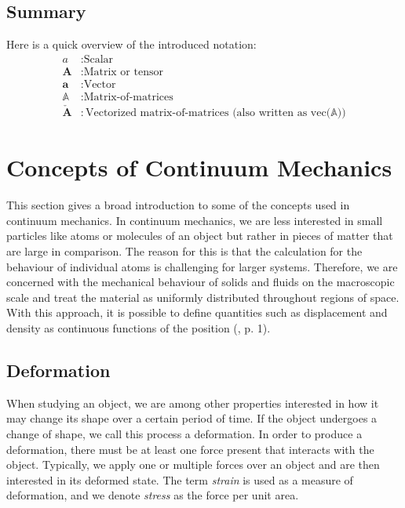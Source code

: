 \subsection{Summary}
Here is a quick overview of the introduced notation:
\begin{align*}
a&: \text{Scalar} \\
\mathbf{A}&: \text{Matrix or tensor} \\
\mathbf{a}&: \text{Vector} \\
\mathbb{A}&: \text{Matrix-of-matrices} \\
\mathbf{\check{A}}&: \text{Vectorized matrix-of-matrices (also written as vec($\mathbb{A}$))}
\end{align*}

\section{Concepts of Continuum Mechanics}
This section gives a broad introduction to some of the concepts used in continuum mechanics. In continuum mechanics, we are less interested in small particles like atoms or molecules of an object but rather in pieces of matter that are large in comparison. The reason for this is that the calculation for the behaviour of individual atoms is challenging for larger systems. Therefore, we are concerned with the mechanical behaviour of solids and fluids on the macroscopic scale and treat the material as uniformly distributed throughout regions of space. With this approach, it is possible to define quantities such as displacement and density as continuous functions of the position (\cite{Spencer1980}, p. 1).

\subsection{Deformation}
When studying an object, we are among other properties interested in how it may change its shape over a certain period of time. If the object undergoes a change of shape, we call this process a deformation. In order to produce a deformation, there must be at least one force present that interacts with the object. Typically, we apply one or multiple forces over an object and are then interested in its deformed state. The term \textit{strain} is used as a measure of deformation, and we denote \textit{stress} as the force per unit area. 

